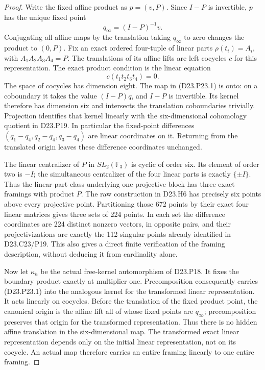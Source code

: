 \begin{proof}
Write the fixed affine product as $p=(v,P)$. Since $I-P$
is invertible, $p$ has the unique fixed point
\[
                         q_\infty=(I-P)^{-1}v.
\]
Conjugating all affine maps by the translation taking
$q_\infty$ to zero changes the product to $(0,P)$.
Fix an exact ordered four-tuple of linear parts
$\rho(t_i)=A_i$, with $A_1A_2A_3A_4=P$.
The translations of its affine lifts are left cocycles
$c$ for this representation. The exact product condition
is the linear equation
\[
                       c(t_1t_2t_3t_4)=0.                 \tag{D23.P23.1}
\]
The space of cocycles has dimension eight. The map in
(D23.P23.1) is onto: on a coboundary it takes the value
$(I-P)q$, and $I-P$ is invertible. Its kernel therefore
has dimension six and intersects the translation
coboundaries trivially. Projection identifies that kernel
linearly with the six-dimensional cohomology quotient in
D23.P19. In particular the fixed-point differences
$(q_1-q_4,q_2-q_4,q_3-q_4)$ are linear coordinates on it.
Returning from the translated origin leaves these
difference coordinates unchanged.

The linear centralizer of $P$ in $SL_2(\mathbb F_3)$ is
cyclic of order six. Its element of order two is $-I$;
the simultaneous centralizer of the four linear parts is
exactly $\{\pm I\}$. Thus the linear-part class underlying
one projective block has three exact framings with product
$P$. The raw construction in D23.H6 has precisely six
points above every projective point. Partitioning those
672 points by their exact four linear matrices gives
three sets of 224 points. In each set the difference
coordinates are 224 distinct nonzero vectors, in opposite
pairs, and their projectivizations are exactly the 112
singular points already identified in D23.C23/P19.
This also gives a direct finite verification of the
framing description, without deducing it from cardinality
alone.

Now let $\kappa_h$ be the actual free-kernel automorphism
of D23.P18. It fixes the boundary product exactly at
multiplier one. Precomposition consequently carries
(D23.P23.1) into the analogous kernel for the transformed
linear representation. It acts linearly on cocycles.
Before the translation of the fixed product point, the
canonical origin is the affine lift all of whose fixed
points are $q_\infty$; precomposition preserves that
origin for the transformed representation. Thus there
is no hidden affine translation in the six-dimensional
map. The transformed exact linear representation depends
only on the initial linear representation, not on its
cocycle. An actual map therefore carries an entire
framing linearly to one entire framing.


\end{proof}
